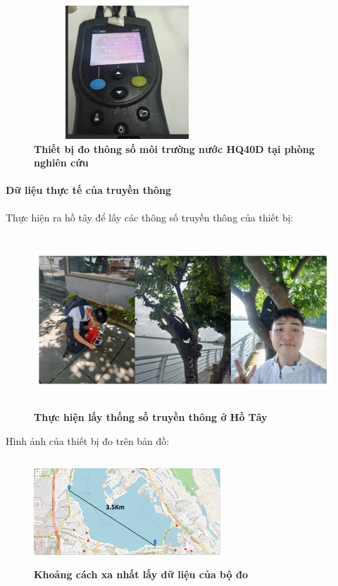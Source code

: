 \documentclass{article} %
\begin{document}
\begin{itemize}
\begin{itemize}[label=$\ast$]
			\begin{figure}[!ht]
				\centering
				\includegraphics[width=7cm,height=5cm]{Images/domc.png}
				\caption[ Thiết bị đo thông số môi trường nước HQ40D tại phòng nghiên cứu ]{\bfseries \fontsize{12pt}{0pt}\selectfont Thiết bị đo thông số môi trường nước HQ40D tại phòng nghiên cứu}
				\label{domc}
			\end{figure}
		\end{itemize}
	\end{itemize}
	\newpage
	\paragraph{Dữ liệu thực tế của truyền thông}\mbox{}
	
	Thực hiện ra hồ tây để lấy các thông số truyền thông của thiết bị: 
	\begin{figure}[!ht]
		\centering
		\includegraphics[width=12cm,height=6.5cm]{Images/hotay.png}
		\caption[ Thực hiện lấy thống số truyền thông ở Hồ Tây ]{\bfseries \fontsize{12pt}{0pt}\selectfont Thực hiện lấy thống số truyền thông ở Hồ Tây}
		\label{hotay}
	\end{figure}
	
	\newpage
	Hình ảnh của thiết bị đo trên bản đồ:
	\begin{figure}[!ht]
		\centering
		\includegraphics[width=7cm,height=4cm]{Images/htgps.png}
		\caption[ Khoảng cách xa nhất lấy dữ liệu của bộ đo ]{\bfseries \fontsize{12pt}{0pt}\selectfont Khoảng cách xa nhất lấy dữ liệu của bộ đo}
		\label{htgps}
	\end{figure}
	
\end{document}
